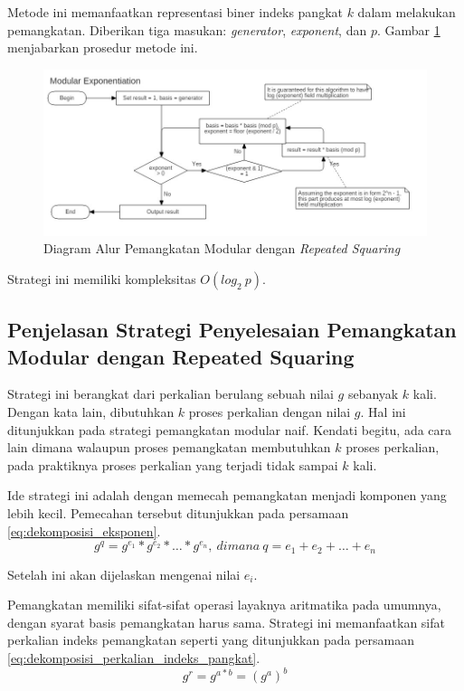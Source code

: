 Metode ini memanfaatkan representasi biner indeks pangkat $k$ dalam melakukan pemangkatan. Diberikan tiga masukan: \textit{generator}, \textit{exponent}, dan $p$. Gambar \ref{fig:repeated_squaring} menjabarkan prosedur metode ini.
\begin{figure}
	\Centering
	\includegraphics[scale=0.5,angle=90]{bab2/img/modular-exponentiation}
	\caption{Diagram Alur Pemangkatan Modular dengan \textit{Repeated Squaring}}
	\label{fig:repeated_squaring}
\end{figure}

Strategi ini memiliki kompleksitas $O\left(log_2\ p\right)$.

\subsection{Penjelasan Strategi Penyelesaian Pemangkatan Modular dengan Repeated Squaring}

Strategi ini berangkat dari perkalian berulang sebuah nilai $g$ sebanyak $k$ kali. Dengan kata lain, dibutuhkan $k$ proses perkalian dengan nilai $g$. Hal ini ditunjukkan pada strategi pemangkatan modular naif. Kendati begitu, ada cara lain dimana walaupun proses pemangkatan membutuhkan $k$ proses perkalian, pada praktiknya proses perkalian yang terjadi tidak sampai $k$ kali.

Ide strategi ini adalah dengan memecah pemangkatan menjadi komponen yang lebih kecil. Pemecahan tersebut ditunjukkan pada persamaan \eqref{eq:dekomposisi_eksponen}.
\begin{equation}
g^q = g^{e_1} * g^{e_2} *\ldots*g^{e_n},\ dimana\ q=e_1+e_2+\ldots+e_n
\label{eq:dekomposisi_eksponen}
\end{equation}

Setelah ini akan dijelaskan mengenai nilai $e_i$. 

Pemangkatan memiliki sifat-sifat operasi layaknya aritmatika pada umumnya, dengan syarat basis pemangkatan harus sama. Strategi ini memanfaatkan sifat perkalian indeks pemangkatan seperti yang ditunjukkan pada persamaan \eqref{eq:dekomposisi_perkalian_indeks_pangkat}.
\begin{equation}
g^r = g^{a*b} = (g^a)^b
\label{eq:dekomposisi_perkalian_indeks_pangkat}
\end{equation}

